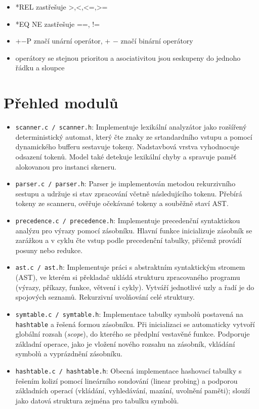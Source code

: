 \documentclass[11pt,a4paper]{article}
\begin{document}
\begin{itemize}
\item *REL zastřešuje >,<,<=,>= \\
\item *EQ NE zastřešuje ==, !=\\
\item +$-$P značí unární operátor, + $-$ značí binární operátory \\
\item operátory se stejnou prioritou a asociativitou jsou seskupeny do jednoho řádku a sloupce
\end{itemize}

\newpage
\section{Přehled modulů}
\begin{itemize}
    \item \texttt{scanner.c / scanner.h}: Implementuje lexikální analyzátor jako rozšířený deterministický automat, který čte znaky ze srtandardního vstupu a pomocí dynamického bufferu sestavuje tokeny. Nadstavbová vrstva vyhodnocuje odsazení tokenů. Model také detekuje lexikální chyby a spravuje paměť alokovanou pro instanci skeneru.
    \item \texttt{parser.c / parser.h}: Parser je implementován metodou rekurzivního sestupu a udržuje si stav zpracování včetně následujícího tokenu. Přebírá tokeny ze scanneru, ověřuje očekávané tokeny a souběžně staví AST.
    \item \texttt{precedence.c / precedence.h}: Implementuje precedenční syntaktickou analýzu pro výrazy pomocí zásobníku. Hlavní funkce inicializuje zásobník se zarážkou a v cyklu čte vstup podle precedenční tabulky, přičemž provádí posuny nebo redukce.
    \item \texttt{ast.c / ast.h}: Implementuje práci s abstraktním syntaktickým stromem (AST), ve kterém si překladač ukládá strukturu zpracovaného programu (výrazy, příkazy, funkce, větvení i cykly). Vytváří jednotlivé uzly a řadí je do spojových seznamů. Rekurzivní uvolňování celé struktury.
    \item \texttt{symtable.c / symtable.h}: Implementace tabulky symbolů postavená na \texttt{hashtable} a řešená formou zásobníku. Při inicializaci se automaticky vytvoří globální rozsah (\emph{scope}), do kterého se předplní vestavěné funkce. Podporuje základní operace, jako je vložení nového rozsahu na zásobník, vkládání symbolů a vyprázdnění zásobníku.
    \item \texttt{hashtable.c / hashtable.h}: Obecná implementace hashovací tabulky s řešením kolizí pomocí lineárního sondování (linear probing) a podporou základních operací (vkládání, vyhledávání, mazání, uvolnění paměti); slouží jako datová struktura zejména pro tabulku symbolů.

\end{itemize}
\end{document}
